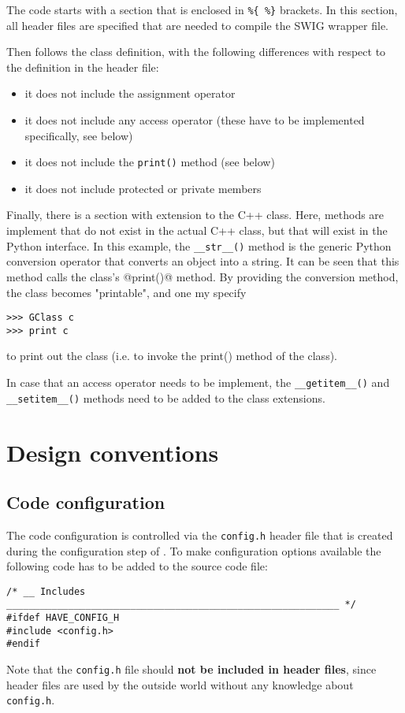 \documentclass{article}[12pt,a4]
\begin{document}
The code starts with a section that is enclosed in {\tt \%\{  \%\}} brackets.
In this section, all header files are specified that are needed to compile the SWIG wrapper
file.

Then follows the class definition, with the following differences with respect to the
definition in the header file:
\begin{itemize}
\item it does not include the assignment operator
\item it does not include any access operator (these have to be implemented specifically, see below)
\item it does not include the {\tt print()} method (see below)
\item it does not include protected or private members
\end{itemize}

Finally, there is a section with extension to the C++ class.
Here, methods are implement that do not exist in the actual C++ class, but that will
exist in the Python interface.
In this example, the {\tt\_\_str\_\_()} method is the generic Python conversion operator that
converts an object into a string.
It can be seen that this method calls the class's @print()@ method.
By providing the conversion method, the class becomes "printable", and one
my specify
\begin{verbatim}
>>> GClass c
>>> print c
\end{verbatim}
to print out the class (i.e. to invoke the print() method of the class).

In case that an access operator needs to be implement, the {\tt\_\_getitem\_\_()} and {\tt\_\_setitem\_\_()}
methods need to be added to the class extensions.


\section{Design conventions}

\subsection{Code configuration}
\label{sec:configure}

The code configuration is controlled via the {\tt config.h} header file that is created during the
configuration step of \this.
To make configuration options available the following code has to be added to the
source code file:
\begin{verbatim}
/* __ Includes ___________________________________________________________ */
#ifdef HAVE_CONFIG_H
#include <config.h>
#endif
\end{verbatim}
Note that the {\tt config.h} file should {\bf not be included in header files}, since header files
are used by the outside world without any knowledge about {\tt config.h}.
\end{document}
